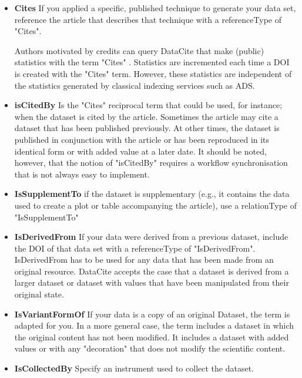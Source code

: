 \documentclass[11pt,a4paper]{ivoa}
\begin{document}
\begin{itemize}
\item{} \textbf{Cites}\newline
If you applied a specific, published technique to generate your data set, reference the article that describes that technique with a referenceType of "Cites".

Authors motivated by credits can query DataCite that make (public) statistics with the term "Cites" . Statistics are incremented each time a DOI is created with the "Cites" term. However, these statistics are independent of the statistics generated by classical indexing services such as ADS.
\item{} \textbf{isCitedBy}\newline
Is the "Cites" reciprocal term that could be used, for instance; when the dataset is cited by the article. Sometimes the article may cite a dataset that has been published previously. At other times, the dataset is published in conjunction with the article or has been reproduced in its identical form or with added value at a later date. It should be noted, however, that the notion of "isCitedBy" requires a workflow synchronisation that is not always easy to implement.
\item{} \textbf{IsSupplementTo}\newline
if the dataset is supplementary (e.g., it contains the data used to create a plot or table accompanying the article), use a relationType of "IsSupplementTo"
\item{} \textbf{IsDerivedFrom}\newline
If your data were derived from a previous dataset, include the DOI of that data set with a referenceType of "IsDerivedFrom". \mbox{IsDerivedFrom} has to be used for any data that has been made from an original resource. DataCite accepts the case that a dataset is derived from a larger dataset or dataset with values that have been manipulated from their original state.
\item{} \textbf{IsVariantFormOf}\newline
If your data is a copy of an original Dataset, the term is adapted for you. In a more general case, the term includes a dataset in which the original content has not been modified. It includes a dataset with added values or with any "decoration" that does not modify the scientific content.
\item{} \textbf{IsCollectedBy}\newline
Specify an instrument used to collect the dataset.
\end{itemize}
\end{document}
